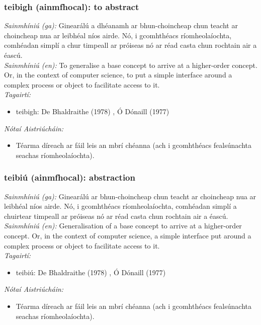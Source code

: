 \subsubsection*{teibigh (ainmfhocal): to abstract}
 \noindent \textit{Sainmhíniú (ga):} Ginearálú a dhéanamh ar bhun-choincheap chun teacht ar choincheap nua ar leibhéal níos airde. Nó, i gcomhthéacs ríomheolaíochta, comhéadan simplí a chur timpeall ar próiseas nó ar réad casta chun rochtain air a éascú.
\\
 \noindent \textit{Sainmhíniú (en):} To generalise a base concept to arrive at a higher-order concept. Or, in the context of computer science, to put a simple interface around a complex process or object to facilitate access to it.
\\
 \noindent \textit{Tagairtí:}
\begin{itemize}
	\item teibigh: De Bhaldraithe (1978) \cite{de-bhaldraithe}, Ó Dónaill (1977) \cite{odonaill}
\end{itemize}

 \noindent \textit{Nótaí Aistriúcháin:}
\begin{itemize}
	\item Téarma díreach ar fáil leis an mbrí chéanna (ach i gcomhthéacs fealsúnachta seachas ríomheolaíochta).
\end{itemize}


\subsubsection*{teibiú (ainmfhocal): abstraction}
 \noindent \textit{Sainmhíniú (ga):} Ginearálú ar bhun-choincheap chun teacht ar choincheap nua ar leibhéal níos airde. Nó, i gcomhthéacs ríomheolaíochta, comhéadan simplí a chuirtear timpeall ar próiseas nó ar réad casta chun rochtain air a éascú.
\\
 \noindent \textit{Sainmhíniú (en):} Generalisation of a base concept to arrive at a higher-order concept. Or, in the context of computer science, a simple interface put around a complex process or object to facilitate access to it.
\\
 \noindent \textit{Tagairtí:}
\begin{itemize}
	\item teibiú: De Bhaldraithe (1978) \cite{de-bhaldraithe}, Ó Dónaill (1977) \cite{odonaill}
\end{itemize}

 \noindent \textit{Nótaí Aistriúcháin:}
\begin{itemize}
	\item Téarma díreach ar fáil leis an mbrí chéanna (ach i gcomhthéacs fealsúnachta seachas ríomheolaíochta).
\end{itemize}


